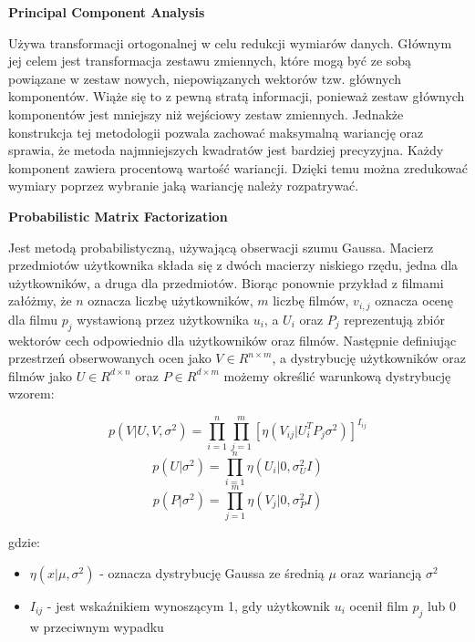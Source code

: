 \textbf{Principal Component Analysis}

Używa transformacji ortogonalnej w celu redukcji wymiarów danych. Głównym jej celem jest transformacja zestawu zmiennych, które mogą być ze sobą powiązane w zestaw nowych, niepowiązanych wektorów tzw. głównych komponentów. Wiąże się to z pewną stratą informacji, ponieważ zestaw głównych komponentów jest mniejszy niż wejściowy zestaw zmiennych. Jednakże konstrukcja tej metodologii pozwala zachować maksymalną wariancję oraz sprawia, że metoda najmniejszych kwadratów jest bardziej precyzyjna. Każdy komponent zawiera procentową wartość wariancji. Dzięki temu można zredukować wymiary poprzez wybranie jaką wariancję należy rozpatrywać.

\bigskip


\textbf{Probabilistic Matrix Factorization}


Jest metodą probabilistyczną, używającą obserwacji szumu Gaussa. Macierz przedmiotów użytkownika składa się z dwóch macierzy niskiego rzędu, jedna dla użytkowników, a druga dla przedmiotów. Biorąc ponownie przykład z filmami załóżmy, że $n$ oznacza liczbę użytkowników, $m$ liczbę filmów, $v_{i,j}$ oznacza ocenę dla filmu $p_j$ wystawioną przez użytkownika $u_i$, a $U_i$ oraz $P_j$ reprezentują zbiór wektorów cech odpowiednio dla użytkowników oraz filmów. Następnie definiując przestrzeń obserwowanych ocen jako $V \in R^{n \times m}$, a dystrybucję użytkowników oraz filmów jako $U \in R^{d \times n}$ oraz $P \in R^{d \times m}$ możemy określić warunkową dystrybucję wzorem:

\begin{equation}
p(V|U,V, \sigma^2) = \prod_{i=1}^{n} \prod_{j=1}^{m} [\eta(V_{ij} | U^{T}_i P_j \sigma^2) ]^{I_{ij}}
\end{equation}
\begin{equation}
p(U|\sigma^2) = \prod_{i=1}^{n} \eta (U_i | 0, \sigma^{2}_U I)
\end{equation}
\begin{equation}
p(P|\sigma^2) = \prod_{j=1}^{m} \eta (V_j | 0, \sigma^{2}_P I)
\end{equation}

gdzie:
\begin{itemize}
	\item[] $\eta(x|\mu, \sigma^2)$ - oznacza dystrybucję Gaussa ze średnią $\mu$ oraz wariancją $\sigma^2$
	\item[] $I_{ij}$ - jest wskaźnikiem wynoszącym 1, gdy użytkownik $u_i$ ocenił film $p_j$ lub 0 w przeciwnym wypadku
\end{itemize}
\newpage

